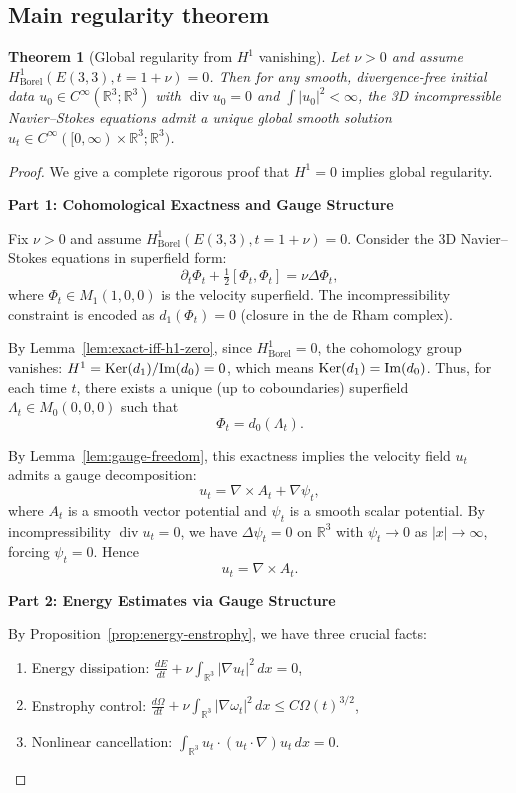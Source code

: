 \documentclass[reqno,10pt]{amsart}
\theoremstyle{plain}
\newtheorem{theorem}{Theorem}[section]
\theoremstyle{definition}
\def\Ker{{\rm Ker}}
\def\div{\operatorname{div}}
\begin{document}
\subsection{Main regularity theorem}

\begin{theorem}[Global regularity from $H^1$ vanishing]\label{thm:main-regularity}
Let $\nu>0$ and assume $H^1_{\text{Borel}}(E(3,3), t=1+\nu) = 0$. Then for any smooth, divergence-free initial data $u_0 \in C^\infty(\mathbb{R}^3;\mathbb{R}^3)$ with $\div u_0=0$ and $\int|u_0|^2 < \infty$, the 3D incompressible Navier--Stokes equations admit a unique global smooth solution $u_t \in C^\infty([0,\infty)\times\mathbb{R}^3;\mathbb{R}^3)$.
\end{theorem}

\begin{proof}
We give a complete rigorous proof that $H^1=0$ implies global regularity.

\textbf{Part 1: Cohomological Exactness and Gauge Structure}

Fix $\nu>0$ and assume $H^1_{\text{Borel}}(E(3,3), t=1+\nu)=0$. Consider the 3D Navier--Stokes equations in superfield form:
\[
  \partial_t \Phi_t + \tfrac{1}{2}[\Phi_t, \Phi_t] = \nu\Delta \Phi_t,
\]
where $\Phi_t \in M_1(1,0,0)$ is the velocity superfield. The incompressibility constraint is encoded as $d_1(\Phi_t) = 0$ (closure in the de Rham complex).

By Lemma~\ref{lem:exact-iff-h1-zero}, since $H^1_{\text{Borel}}=0$, the cohomology group vanishes: $H^1 = \Ker(d_1)/\text{Im}(d_0) = 0$, which means $\Ker(d_1) = \text{Im}(d_0)$. Thus, for each time $t$, there exists a unique (up to coboundaries) superfield $\Lambda_t \in M_0(0,0,0)$ such that
\[
  \Phi_t = d_0(\Lambda_t).
\]

By Lemma~\ref{lem:gauge-freedom}, this exactness implies the velocity field $u_t$ admits a gauge decomposition:
\[
  u_t = \nabla\times A_t + \nabla\psi_t,
\]
where $A_t$ is a smooth vector potential and $\psi_t$ is a smooth scalar potential. By incompressibility $\div u_t = 0$, we have $\Delta\psi_t = 0$ on $\mathbb{R}^3$ with $\psi_t \to 0$ as $|x|\to\infty$, forcing $\psi_t = 0$. Hence
\[
  u_t = \nabla\times A_t.
\]

\textbf{Part 2: Energy Estimates via Gauge Structure}

By Proposition~\ref{prop:energy-enstrophy}, we have three crucial facts:
\begin{enumerate}
\item Energy dissipation: $\frac{dE}{dt} + \nu\int_{\mathbb{R}^3} |\nabla u_t|^2\,dx = 0$,
\item Enstrophy control: $\frac{d\Omega}{dt} + \nu\int_{\mathbb{R}^3} |\nabla\omega_t|^2\,dx \le C\Omega(t)^{3/2}$,
\item Nonlinear cancellation: $\int_{\mathbb{R}^3} u_t\cdot(u_t\cdot\nabla)u_t\,dx = 0$.
\end{enumerate}


\end{proof}
\end{document}
